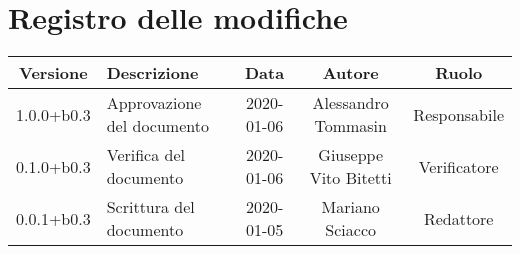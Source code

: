 \section*{Registro delle modifiche}

\begin{center}
	\begin{longtable}{|c|p{3cm}|c|c|c|}
	\hline
	\rowcolor{lighter-grayer}
	\textbf{Versione} & \textbf{Descrizione} & \textbf{Data} & \textbf{Autore} & \textbf{Ruolo} \\
	\hline
	\endfirsthead


	1.0.0+b0.3 & Approvazione del documento & 2020-01-06 & Alessandro Tommasin & Responsabile \\
	\hline
	0.1.0+b0.3 & Verifica del documento & 2020-01-06 & Giuseppe Vito Bitetti & Verificatore \\
	\hline
	0.0.1+b0.3 & Scrittura del documento & 2020-01-05 & Mariano Sciacco & Redattore \\
	\hline

	\end{longtable}
\end{center}